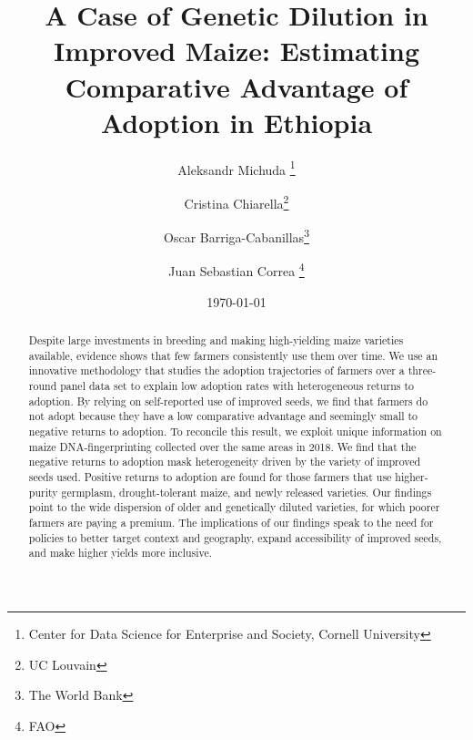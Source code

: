 \documentclass[11pt]{article}
\begin{document}
    \begin{titlepage}
    \title{A Case of Genetic Dilution in Improved Maize: Estimating Comparative Advantage of Adoption in Ethiopia}


\author{%
 Aleksandr Michuda \footnote{Center for Data Science for Enterprise and Society, Cornell University}%
 \and Cristina Chiarella\footnote{UC Louvain}%
 \and Oscar Barriga-Cabanillas\footnote{The World Bank}%
  \and Juan Sebastian Correa \footnote{FAO}%
  }
	\date{\today}

    \clearpage\maketitle
	\thispagestyle{empty}
	\vspace*{-2em}
    \begin{center}\begin{abstract}
			\noindent  
			Despite large investments in breeding and making high-yielding maize varieties available, evidence shows that few farmers consistently use them over time. We use an innovative methodology that studies the adoption trajectories of farmers over a three-round panel data set to explain low adoption rates with heterogeneous returns to adoption. By relying on self-reported use of improved seeds, we find that farmers do not adopt because they have a low comparative advantage and seemingly small to negative returns to adoption. To reconcile this result, we exploit unique information on maize DNA-fingerprinting collected over the same areas in 2018. We find that the negative returns to adoption mask heterogeneity driven by the variety of improved seeds used. Positive returns to adoption are found for those farmers that use higher-purity germplasm, drought-tolerant maize, and newly released varieties. Our findings point to the wide dispersion of older and genetically diluted varieties, for which poorer farmers are paying a premium. The implications of our findings speak to the need for policies to better target context and geography, expand accessibility of improved seeds, and make higher yields more inclusive.
			

\end{abstract}
\end{center}
\end{titlepage}
\end{document}
